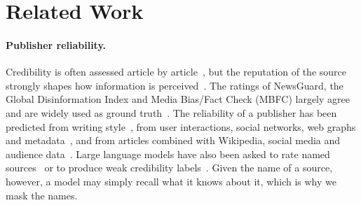 \documentclass[11pt,a4paper]{article}
\begin{document}
\section{Related Work}\label{sec:related}

\paragraph{Publisher reliability.} Credibility is often assessed article by article~\cite{pandolfi2020automatic,
10.1145/3770077}, but the reputation of the source strongly shapes how information is
perceived~\cite{doi:10.1080/07421222.2019.1628921}. The ratings of NewsGuard, the Global Disinformation Index and Media
Bias/Fact Check (MBFC) largely agree and are widely used as ground truth~\cite{lin2023high,DBLP:conf/icwsm/PratelliP22}.
The reliability of a publisher has been predicted from writing style~\cite{przybyla2020capturing,potthast2018stylometric},
from user interactions, social networks, web graphs and
metadata~\cite{bazmi2023multi,DBLP:conf/ecir/PratelliSP25,DBLP:conf/icwsm/WilliamsCC25,DBLP:journals/jdiq/LongoZCZC25},
and from articles combined with Wikipedia, social media and audience
data~\cite{baly2018predicting,baly2020written,nakov2024survey}. Large language models have also been asked to rate named
sources~\cite{yang2023large} or to produce weak credibility labels~\cite{Leite2025}. Given the name of a source, however,
a model may simply recall what it knows about it, which is why we mask the names.
\end{document}
